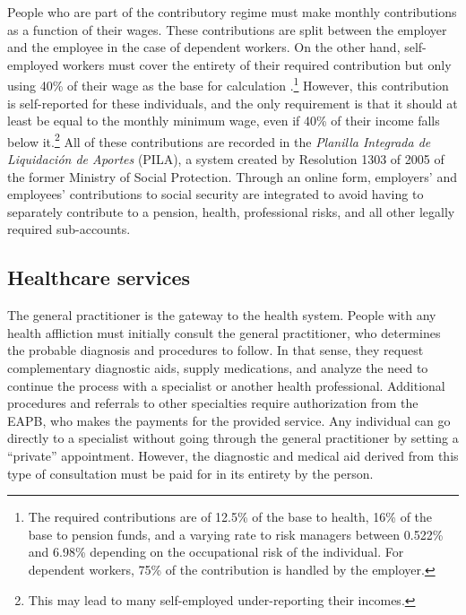 \documentclass[12pt, a4paper]{article}
\begin{document}
People who are part of the contributory regime must make monthly contributions as a function of their wages. These contributions are split between the employer and the employee in the case of dependent workers. On the other hand, self-employed workers must cover the entirety of their required contribution but only using 40\% of their wage as the base for calculation \citep{Aseguramiento}.\footnote{The required contributions are of 12.5\% of the base to health, 16\% of the base to pension funds, and a varying rate to risk managers between 0.522\% and 6.98\% depending on the occupational risk of the individual. For dependent workers, 75\% of the contribution is handled by the employer.} However, this contribution is self-reported for these individuals, and the only requirement is that it should at least be equal to the monthly minimum wage, even if 40\% of their income falls below it.\footnote{This may lead to many self-employed under-reporting their incomes.} All of these contributions are recorded in the \textit{Planilla Integrada de Liquidación de Aportes} (PILA), a system created by Resolution 1303 of 2005 of the former Ministry of Social Protection. Through an online form, employers' and employees' contributions to social security are integrated to avoid having to separately contribute to a pension, health, professional risks, and all other legally required sub-accounts.


\subsection{Healthcare services}

The general practitioner is the gateway to the health system. People with any health affliction must initially consult the general practitioner, who determines the probable diagnosis and procedures to follow. In that sense, they request complementary diagnostic aids, supply medications, and analyze the need to continue the process with a specialist or another health professional. Additional procedures and referrals to other specialties require authorization from the EAPB, who makes the payments for the provided service. Any individual can go directly to a specialist without going through the general practitioner by setting a ``private'' appointment. However, the diagnostic and medical aid derived from this type of consultation must be paid for in its entirety by the person.
\end{document}
